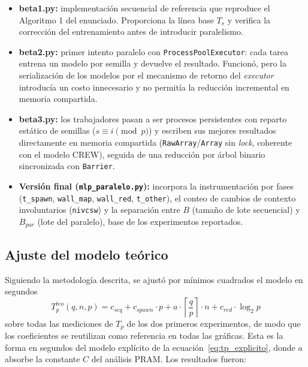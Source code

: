 \documentclass[11pt, a4paper]{article}
\begin{document}
\begin{itemize}
    \item \textbf{beta1.py:} implementación secuencial de referencia que reproduce el Algoritmo 1 del enunciado. Proporciona la línea base $T_s$ y verifica la corrección del entrenamiento antes de introducir paralelismo.
    \item \textbf{beta2.py:} primer intento paralelo con \texttt{ProcessPoolExecutor}: cada tarea entrena un modelo por semilla y devuelve el resultado. Funcionó, pero la serialización de los modelos por el mecanismo de retorno del \textit{executor} introducía un costo innecesario y no permitía la reducción incremental en memoria compartida.
    \item \textbf{beta3.py:} los trabajadores pasan a ser procesos persistentes con reparto estático de semillas ($s \equiv i \pmod p$) y escriben sus mejores resultados directamente en memoria compartida (\texttt{RawArray}/\texttt{Array} sin \textit{lock}, coherente con el modelo CREW), seguida de una reducción por árbol binario sincronizada con \texttt{Barrier}.
    \item \textbf{Versión final (\texttt{mlp\_paralelo.py}):} incorpora la instrumentación por fases (\texttt{t\_spawn}, \texttt{wall\_map}, \texttt{wall\_red}, \texttt{t\_other}), el conteo de cambios de contexto involuntarios (\texttt{nivcsw}) y la separación entre $B$ (tamaño de lote secuencial) y $B_{par}$ (lote del paralelo), base de los experimentos reportados.
\end{itemize}

\subsection{Ajuste del modelo teórico}

Siguiendo la metodología descrita, se ajustó por mínimos cuadrados el modelo en segundos
\begin{equation}
T_p^{teo}(q, n, p) = c_{seq} + c_{spawn} \cdot p + a \cdot \left\lceil \frac{q}{p} \right\rceil \cdot n + c_{red} \cdot \log_2 p
\label{eq:tpeo}
\end{equation}
sobre todas las mediciones de $T_p$ de los dos primeros experimentos, de modo que los coeficientes se reutilizan como referencia en todas las gráficas. Esta es la forma en segundos del modelo explícito de la ecuación~\eqref{eq:tp_explicito}, donde $a$ absorbe la constante $C$ del análisis PRAM. Los resultados fueron:
\end{document}
